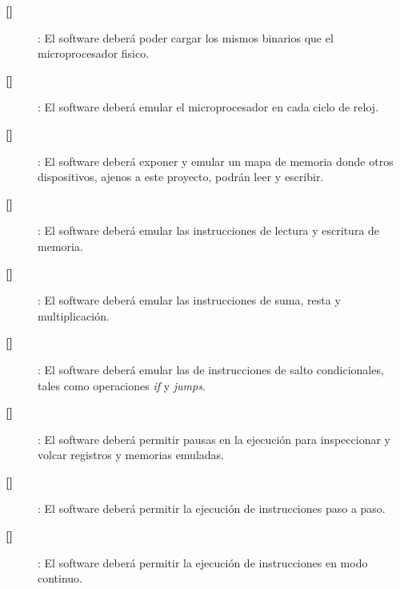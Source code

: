 \documentclass[
  11pt, %
  codirector, %
]{charter}
\makeatletter
\newcommand{\mytwodigits}[1]{\two@digits{#1}}
\newcounter{reqCounter}
\makeatother
\begin{document}
\begin{description}

\item[\textbf{[\CODrequerimiento\mytwodigits{\value{reqCounter}}]}]: El software deberá poder cargar los mismos binarios que el microprocesador fisico.

\item[\textbf{[\CODrequerimiento\mytwodigits{\value{reqCounter}}]}]: El software deberá emular el microprocesador en cada ciclo de reloj.

\item[\textbf{[\CODrequerimiento\mytwodigits{\value{reqCounter}}]}]: El software deberá exponer y emular un mapa de memoria donde otros dispositivos, ajenos a este proyecto, podrán leer y escribir.

\item[\textbf{[\CODrequerimiento\mytwodigits{\value{reqCounter}}]}]: El software deberá emular las instrucciones de lectura y escritura de memoria.

\item[\textbf{[\CODrequerimiento\mytwodigits{\value{reqCounter}}]}]: El software deberá emular las instrucciones de suma, resta y multiplicación.

\item[\textbf{[\CODrequerimiento\mytwodigits{\value{reqCounter}}]}]: El software deberá emular las de instrucciones de salto condicionales, tales como operaciones \textit{if} y \textit{jumps}.

\item[\textbf{[\CODrequerimiento\mytwodigits{\value{reqCounter}}]}]: El software deberá permitir pausas en la ejecución para inspeccionar y volcar registros y memorias emuladas.

\item[\textbf{[\CODrequerimiento\mytwodigits{\value{reqCounter}}]}]: El software deberá permitir la ejecución de instrucciones paso a paso.

\item[\textbf{[\CODrequerimiento\mytwodigits{\value{reqCounter}}]}]: El software deberá permitir la ejecución de instrucciones en modo continuo.

\end{description}
\end{document}
